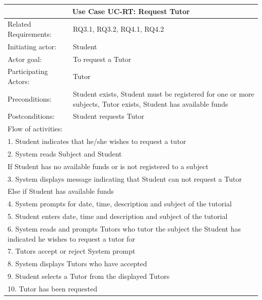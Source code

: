 \documentclass[12pt]{article}
\begin{document}
{\begin{tabular}{| l | p{10cm}| }
			\hline\multicolumn{2}{|c|}{ \textbf{Use Case UC-RT: Request Tutor}} \\ \hline
			Related Requirements: & RQ3.1, RQ3.2, RQ4.1, RQ4.2\\ \hline
			Initiating actor: & Student\\ \hline
			Actor goal: & To request a Tutor\\ \hline
			Participating Actors: & Tutor\\ \hline
			Preconditions: & Student exists, Student must be registered for one or more subjects, Tutor exists, Student has available funds\\ \hline
			Postconditions: & Student requests Tutor\\ \hline
			\multicolumn{2}{|l|}{Flow of activities:}\\ \hline
			\multicolumn{2}{|p{15cm}|}{1. Student indicates that he/she wishes to request a tutor}\\
			\multicolumn{2}{|p{15cm}|}{2. System reads Subject and Student}\\
			\multicolumn{2}{|p{15cm}|}{If Student has no available funds or is not registered to a subject}\\
			\multicolumn{2}{|p{15cm}|}{3. System displays message indicating that Student can not request a Tutor}\\
			\multicolumn{2}{|p{15cm}|}{Else if Student has available funds }	\\
			\multicolumn{2}{|l|}{4. System prompts for date, time, description and subject of the tutorial}\\
			\multicolumn{2}{|l|}{5. Student enters date, time and description and subject of the tutorial}\\
			\multicolumn{2}{|p{15cm}|}{6. System reads and prompts Tutors who tutor the subject the Student has indicated he wishes to request a tutor for}\\
			\multicolumn{2}{|l|}{7. Tutors accept or reject System prompt}\\
			\multicolumn{2}{|l|}{8. System displays Tutors who have accepted}\\
			\multicolumn{2}{|l|}{9. Student selects a Tutor from the displayed Tutors}\\
			\multicolumn{2}{|l|}{10. Tutor has been requested}
			\\ \hline
		\end{tabular}

}
\end{document}
